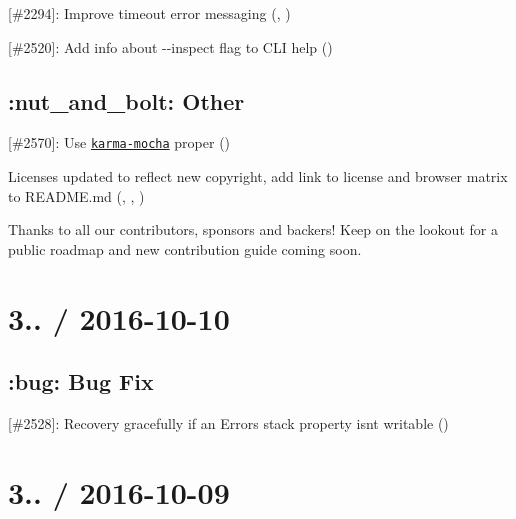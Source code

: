 \begin{DoxyItemize}
\item \mbox{[}\#2294\mbox{]}\+: Improve timeout error messaging (\href{https://github.com/jeversmann}{\tt }, \href{https://github.com/boneskull}{\tt })
\item \mbox{[}\#2520\mbox{]}\+: Add info about {\ttfamily -\/-\/inspect} flag to C\+LI help (\href{https://github.com/ughitsaaron}{\tt })
\end{DoxyItemize}

\subsection*{\+:nut\+\_\+and\+\_\+bolt\+: Other}


\begin{DoxyItemize}
\item \mbox{[}\#2570\mbox{]}\+: Use \href{https://npmjs.com/package/karma-mocha}{\tt karma-\/mocha} proper (\href{https://github.com/boneskull}{\tt })
\item Licenses updated to reflect new copyright, add link to license and browser matrix to {\ttfamily R\+E\+A\+D\+M\+E.\+md} (\href{https://github.com/boneskull}{\tt }, \href{https://github.com/ScottFreeCode}{\tt }, \href{https://github.com/dasilvacontin}{\tt })
\end{DoxyItemize}

Thanks to all our contributors, sponsors and backers! Keep on the lookout for a public roadmap and new contribution guide coming soon.

\section*{3.. / 2016-\/10-\/10}

\subsection*{\+:bug\+: Bug Fix}


\begin{DoxyItemize}
\item \mbox{[}\#2528\mbox{]}\+: Recovery gracefully if an {\ttfamily Error}\textquotesingle{}s {\ttfamily stack} property isn\textquotesingle{}t writable (\href{https://github.com/boneskull}{\tt })
\end{DoxyItemize}

\section*{3.. / 2016-\/10-\/09}

